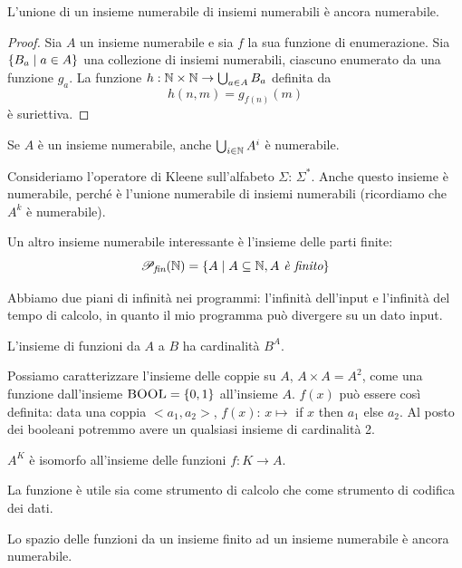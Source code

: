\begin{lem}
    L'unione di un insieme numerabile di insiemi numerabili è ancora numerabile.
\end{lem}
\begin{proof}
    Sia $A$ un insieme numerabile e sia $f$ la sua funzione di enumerazione. Sia $\{B_{a}\mid a
    \in A\}$ una collezione di insiemi numerabili, ciascuno enumerato da una funzione $g_{a}$. La funzione
    $h : \mathbb{N} \times \mathbb{N} \to \bigcup_{a \in A}B_{a}$ definita da
    \begin{equation*}
        h(n,m) = g_{f(n)}(m)
    \end{equation*}
    è suriettiva.
\end{proof}

\begin{lem}
    Se $A$ è un insieme numerabile, anche $\bigcup_{i \in \mathbb{N}} A^{i}$ è numerabile.
\end{lem}

Consideriamo l'operatore di Kleene sull'alfabeto $\Sigma$: $\Sigma^{*}$. Anche questo insieme è
numerabile, perché è l'unione numerabile di insiemi numerabili (ricordiamo che $A^{k}$ è numerabile).

Un altro insieme numerabile interessante è l'insieme delle parti finite:
\begin{equation*}
    \mathscr{P}_{\textit{fin}}(\mathbb{N}) = \{A \mid A \subseteq \mathbb{N}, \textit{$A$  è finito}\}
\end{equation*}

Abbiamo due piani di infinità nei programmi: l'infinità dell'input e l'infinità del tempo di
calcolo, in quanto il mio programma può divergere su un dato input.

L'insieme di funzioni da $A$ a $B$ ha cardinalità $B^{A}$.

Possiamo caratterizzare l'insieme delle coppie su $A$, $A \times A = A^{2}$, come una funzione
dall'insieme $\bm{\textsc{BOOL}} = \{0,1\}$ all'insieme $A$. $f(x)$ può essere così definita: data
una coppia $<a_{1},a_{2}>$, $f(x)$: $ x \mapsto $ if $x$ then $a_{1}$ else $a_{2}$. Al posto dei booleani potremmo
avere un qualsiasi insieme di cardinalità 2.

$A^{K}$ è isomorfo all'insieme delle funzioni $f: K \to A$.

La funzione è utile sia come strumento di calcolo che come strumento di codifica dei dati.

Lo spazio delle funzioni da un insieme finito ad un insieme numerabile è ancora numerabile.

